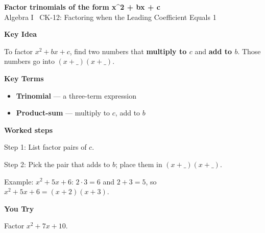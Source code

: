 \documentclass[12pt]{article}
\begin{document}
\begin{center}{\Large \textbf{Factor trinomials of the form x\textasciicircum{}2 + bx + c}}\\[2pt]{\small Algebra I \textbar\ CK-12: Factoring when the Leading Coefficient Equals 1}\end{center}\vspace{0.25cm}

{\large\textbf{Key Idea}}\par\smallskip
To factor $x^2+bx+c$, find two numbers that \textbf{multiply to $c$} and \textbf{add to $b$}. Those numbers go into $(x+\_)(x+\_)$.\par


{\large\textbf{Key Terms}}\par\smallskip
\begin{itemize}[leftmargin=1.4em]
  \item \textbf{Trinomial} — a three-term expression
  \item \textbf{Product-sum} — multiply to $c$, add to $b$
\end{itemize}


{\large\textbf{Worked steps}}\par\smallskip
Step 1: List factor pairs of $c$.\par
Step 2: Pick the pair that adds to $b$; place them in $(x+\_)(x+\_)$.\par
Example: $x^2+5x+6$: $2\cdot3=6$ and $2+3=5$, so $x^2+5x+6=(x+2)(x+3)$.\par


{\large\textbf{You Try}}\par\smallskip
Factor $x^2+7x+10$.\par
\end{document}
